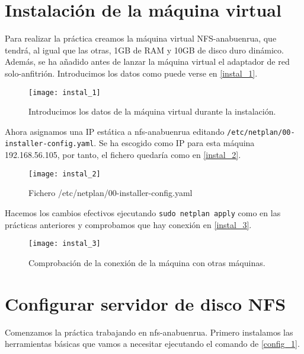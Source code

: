 
\chapter{Instalación de la máquina virtual}

Para realizar la práctica creamos la máquina virtual NFS-anabuenrua, que tendrá, al igual que las otras, 1GB de RAM y 10GB de disco duro dinámico. Además, se ha añadido antes de lanzar la máquina virtual el adaptador de red solo-anfitrión. Introducimos los datos como puede verse en \eqref{instal_1}.

\begin{figure}[h!]
\begin{center}
\caption{Introducimos los datos de la máquina virtual durante la instalación.}
\label{instal_1}
\texttt{[image: instal\_1]}
\end{center}
\end{figure}

Ahora asignamos una IP estática a nfs-anabuenrua editando \verb|/etc/netplan/00-installer-config.yaml|. Se ha escogido como IP para esta máquina 192.168.56.105, por tanto, el fichero quedaría como en \eqref{instal_2}.

\begin{figure}[h!]
\begin{center}
\caption{Fichero /etc/netplan/00-installer-config.yaml}
\label{instal_2}
\texttt{[image: instal\_2]}
\end{center}
\end{figure}

Hacemos los cambios efectivos ejecutando \verb|sudo netplan apply| como en las prácticas anteriores y comprobamos que hay conexión en \eqref{instal_3}.

\begin{figure}[h!]
\begin{center}
\caption{Comprobación de la conexión de la máquina con otras máquinas.}
\label{instal_3}
\texttt{[image: instal\_3]}
\end{center}
\end{figure}

\chapter{Configurar servidor de disco NFS}

Comenzamos la práctica trabajando en nfs-anabuenrua. Primero instalamos las herramientas básicas que vamos a necesitar ejecutando el comando de \eqref{config_1}.

